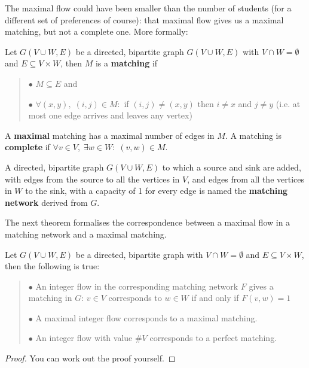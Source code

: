 The maximal flow could have been smaller than the number of
students (for a different set of preferences of course): that maximal
flow gives us a maximal matching, but not a complete one. More
formally:


 \begin{definition}
{\rm Let $G(V \cup W,E)$ be a directed, bipartite graph $G(V \cup
W,E)$ with $V \cap W = \emptyset$ and $E \subseteq V \times W$, then
$M$ is a \textbf{matching} if
\begin{verse}
\hspace*{1ex}$\bullet$
$M \subseteq E$ and

\hspace*{1ex}$\bullet$
$\forall (x,y),\;(i,j) \in M:$ if $(i,j) \neq (x,y)$ then
$i \neq x$ and $j \neq y$
(i.e. at most one edge arrives and leaves any vertex)
\end{verse}
A \textbf{maximal} matching has a maximal number of edges in $M$. A
matching is \textbf{complete} if $\forall v \in V,\; \exists w\in W:\;
(v,w) \in M$.  }
\end{definition}

A directed, bipartite graph $G(V \cup W,E)$ to which a source and sink
are added, with edges from the source to all the vertices in $V$, and edges from
all the vertices in $W$ to the sink, with a capacity of 1 for every
edge is named the \textbf{matching network} derived from $G$.


The next theorem formalises the correspondence between a maximal
flow in a matching network and a maximal matching.

 \begin{theorem}
Let $G(V \cup W,E)$ be a directed, bipartite graph
with $V \cap W = \emptyset$ and $E \subseteq V \times W$, then the
following is true:
\begin{verse}
\hspace*{1ex}$\bullet$
An integer flow in the corresponding matching network $F$ gives a
matching in $G$: $v \in V$ corresponds to $w \in W$ if and only if
$F(v,w) = 1$

\hspace*{1ex}$\bullet$
A maximal integer flow corresponds to a maximal matching.

\hspace*{1ex}$\bullet$
An integer flow with value $\#V$ corresponds to a perfect matching.
\end{verse}
\end{theorem}
\begin{proof}
You can work out the proof yourself.
\end{proof}

